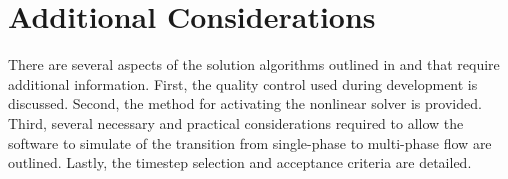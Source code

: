%
%

\section{Additional Considerations}
\label{sect:miscConcerns}

There are several aspects of the solution algorithms outlined in  and  that require additional information.
First, the quality control used during development is discussed.
Second, the method for activating the nonlinear solver is provided.
Third, several necessary and practical considerations required to allow the software to simulate of the transition from single-phase to multi-phase flow are outlined.
Lastly, the timestep selection and acceptance criteria are detailed.

